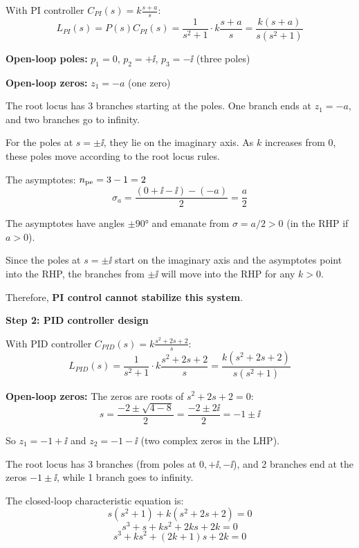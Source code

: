 \documentclass[11pt,a4paper]{article}
\begin{document}
With PI controller $C_{PI}(s) = k\frac{s+a}{s}$:
\begin{equation}
  L_{PI}(s) = P(s)C_{PI}(s) = \frac{1}{s^2 + 1} \cdot k\frac{s+a}{s} = \frac{k(s+a)}{s(s^2+1)}
\end{equation}

\textbf{Open-loop poles:} $p_1 = 0$, $p_2 = +\ii$, $p_3 = -\ii$ (three poles)

\textbf{Open-loop zeros:} $z_1 = -a$ (one zero)

The root locus has 3 branches starting at the poles. One branch ends at $z_1 = -a$, and two branches go to infinity.

For the poles at $s = \pm \ii$, they lie on the imaginary axis. As $k$ increases from 0, these poles move according to the root locus rules.

The asymptotes: $n_{\text{pe}} = 3 - 1 = 2$
\begin{equation}
  \sigma_a = \frac{(0 + \ii - \ii) - (-a)}{2} = \frac{a}{2}
\end{equation}

The asymptotes have angles $\pm 90°$ and emanate from $\sigma = a/2 > 0$ (in the RHP if $a > 0$).

Since the poles at $s = \pm \ii$ start on the imaginary axis and the asymptotes point into the RHP, the branches from $\pm \ii$ will move into the RHP for any $k > 0$.

Therefore, \textbf{PI control cannot stabilize this system}.

\textbf{Step 2: PID controller design}

With PID controller $C_{PID}(s) = k\frac{s^2 + 2s + 2}{s}$:
\begin{equation}
  L_{PID}(s) = \frac{1}{s^2 + 1} \cdot k\frac{s^2 + 2s + 2}{s} = \frac{k(s^2 + 2s + 2)}{s(s^2+1)}
\end{equation}

\textbf{Open-loop zeros:} The zeros are roots of $s^2 + 2s + 2 = 0$:
\begin{equation}
  s = \frac{-2 \pm \sqrt{4 - 8}}{2} = \frac{-2 \pm 2\ii}{2} = -1 \pm \ii
\end{equation}

So $z_1 = -1 + \ii$ and $z_2 = -1 - \ii$ (two complex zeros in the LHP).

The root locus has 3 branches (from poles at $0, +\ii, -\ii$), and 2 branches end at the zeros $-1 \pm \ii$, while 1 branch goes to infinity.

The closed-loop characteristic equation is:
\begin{equation}
  s(s^2+1) + k(s^2 + 2s + 2) = 0
\end{equation}
\begin{equation}
  s^3 + s + ks^2 + 2ks + 2k = 0
\end{equation}
\begin{equation}
  s^3 + ks^2 + (2k+1)s + 2k = 0
\end{equation}
\end{document}
